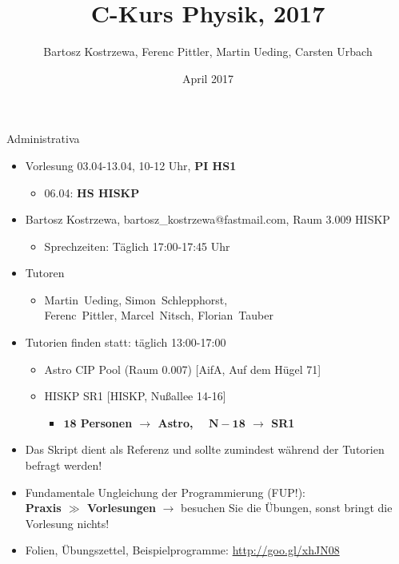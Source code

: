 \documentclass[xcolor=dvipsnames]{beamer}
\author[B. Kostrzewa]{Bartosz Kostrzewa, Ferenc Pittler, Martin Ueding, Carsten Urbach}
\title{C-Kurs Physik, 2017}
\institute[HISKP]{HISKP, Rheinische Friedrich-Wilhelms-Universität Bonn}
\date[April 2017]{April 2017}
\begin{document}
\begin{frame}
 \titlepage
\end{frame}

\begin{frame}{Administrativa}
  \begin{itemize}
  \item{Vorlesung 03.04-13.04, 10-12 Uhr, \textbf{PI HS1}}
  \begin{itemize}
    \item{06.04: \textbf{HS HISKP} }
  \end{itemize}
  \vspace{0.2cm}
  \item{Bartosz Kostrzewa, bartosz\_kostrzewa@fastmail.com, Raum 3.009 HISKP}
  \begin{itemize}
    \item{Sprechzeiten: Täglich 17:00-17:45 Uhr}
  \end{itemize}
  \vspace{0.2cm}
  \item{Tutoren}
  \begin{itemize}
    \item{Martin~Ueding, Simon~Schlepphorst, 
         \\Ferenc~Pittler, Marcel~Nitsch, Florian~Tauber} 
  \end{itemize}
  \vspace{0.2cm}
  \item{Tutorien finden statt: täglich 13:00-17:00}
  \begin{itemize}
    \item{Astro CIP Pool (Raum 0.007) [AifA, Auf dem Hügel 71]}
    \item{HISKP SR1 [HISKP, Nußallee 14-16]}
    \begin{itemize}
      \item{\textbf{ $\mathbf{18}$ Personen $\rightarrow$ Astro, $\quad\mathbf{N-18}$ $\rightarrow$ SR1} }
    \end{itemize}
  \end{itemize}
  \vspace{0.2cm}
  \item{Das Skript dient als Referenz und sollte zumindest während der Tutorien befragt werden!}
  \vspace{0.2cm}
  \item{Fundamentale Ungleichung der Programmierung (FUP!): \\ \textbf{Praxis $\mathbf{\gg}$ Vorlesungen} $\rightarrow$ besuchen Sie die Übungen, sonst bringt die Vorlesung nichts!}
  \item{Folien, Übungszettel, Beispielprogramme: \textcolor{blue}{\url{http://goo.gl/xhJN08}}}
  \end{itemize}
\end{frame}
\end{document}
